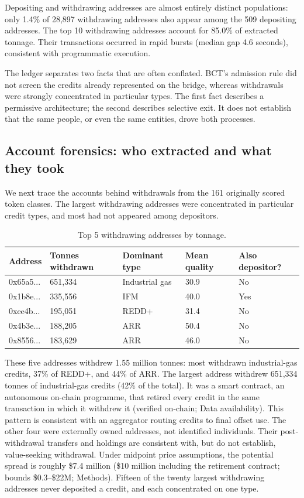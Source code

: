 \documentclass[sn-nature,Numbered]{sn-jnl}
\begin{document}
Depositing and withdrawing addresses are almost entirely distinct populations: only 1.4\% of 28,897 withdrawing addresses also appear among the 509 depositing addresses. The top 10 withdrawing addresses account for 85.0\% of extracted tonnage. Their transactions occurred in rapid bursts (median gap 4.6 seconds), consistent with programmatic execution.

The ledger separates two facts that are often conflated. BCT's admission rule did not screen the credits already represented on the bridge, whereas withdrawals were strongly concentrated in particular types. The first fact describes a permissive architecture; the second describes selective exit. It does not establish that the same people, or even the same entities, drove both processes.


\subsection*{Account forensics: who extracted and what they took}

We next trace the accounts behind withdrawals from the 161 originally scored token classes. The largest withdrawing addresses were concentrated in particular credit types, and most had not appeared among depositors.

\begin{table}[h!]
\caption{Top 5 withdrawing addresses by tonnage.}\label{tab:top5}
\begin{tabular}{lllll}
\toprule
Address & Tonnes withdrawn & Dominant type & Mean quality & Also depositor? \\
\midrule
0x65a5... & 651,334 & Industrial gas & 30.9 & No \\
0x1b8e... & 335,556 & IFM & 40.0 & Yes \\
0xee4b... & 195,051 & REDD+ & 31.4 & No \\
0x4b3e... & 188,205 & ARR & 50.4 & No \\
0x8556... & 183,629 & ARR & 46.0 & No \\
\bottomrule
\end{tabular}
\end{table}

These five addresses withdrew 1.55 million tonnes: most withdrawn industrial-gas credits, 37\% of REDD+, and 44\% of ARR. The largest address withdrew 651,334 tonnes of industrial-gas credits (42\% of the total). It was a smart contract, an autonomous on-chain programme, that retired every credit in the same transaction in which it withdrew it (verified on-chain; Data availability). This pattern is consistent with an aggregator routing credits to final offset use. The other four were externally owned addresses, not identified individuals. Their post-withdrawal transfers and holdings are consistent with, but do not establish, value-seeking withdrawal. Under midpoint price assumptions, the potential spread is roughly \$7.4 million (\$10 million including the retirement contract; bounds \$0.3--\$22M; Methods). Fifteen of the twenty largest withdrawing addresses never deposited a credit, and each concentrated on one type.
\end{document}
